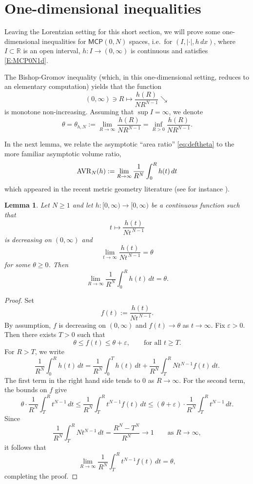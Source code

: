 \documentclass[a4paper,10pt]{article}
\newcommand{\R}{\mathbb{R}}
\newcommand{\MCP}{\mathsf{MCP}}
\theoremstyle{plain}
\newtheorem{lemma}{Lemma}[section]
\theoremstyle{definition}
\numberwithin{equation}{section}
\begin{document}
\section{One-dimensional inequalities}


Leaving the Lorentzian setting for this short section, we will prove some one-dimensional inequalities for $\MCP(0,N)$ spaces, i.e.\ for   $(I,|\cdot|, h \,dx)$, where $I\subset \R$ is an open interval,  $h:I\to (0,\infty)$ is continuous and satisfies \eqref{E:MCP0N1d}.

The Bishop-Gromov inequality (which, in this one-dimensional setting, reduces to an elementary computation) yields that the function $$(0,\infty) \ni R\mapsto  \frac{h(R)}{NR^{N-1}}\searrow$$ is monotone non-increasing. Assuming that $\sup I=\infty$,  we denote 
 \begin{equation}\label{eq:deftheta}
 \theta=\theta_{h,N}:=\lim_{R\to \infty} \frac{h(R)}{NR^{N-1}}=\inf_{R>0} \frac{h(R)}{NR^{N-1}}.
 \end{equation}

 In the next lemma, we relate the asymptotic ``area ratio'' \eqref{eq:deftheta} to the more familiar asymptotic volume ratio,
 $$
 {\rm{AVR}}_N(h):=\lim_{R\to\infty}\frac{1}{R^N}\int_0^R h(t)\,dt
 $$
 which appeared in the recent metric geometry literature (see for instance \cite{BK-MathAnn, CaMa-JEMS}). 

 \begin{lemma}
Let $N\ge 1$ and let $h:[0,\infty)\to[0,\infty)$ be a continuous function such that
\[
t\mapsto \frac{h(t)}{Nt^{\,N-1}}
\]
is decreasing on $(0,\infty)$ and
\[
\lim_{t\to\infty}\frac{h(t)}{Nt^{\,N-1}}=\theta
\]
for some $\theta\ge 0$. Then
\[
\lim_{R\to\infty}\frac{1}{R^N}\int_0^R h(t)\,dt=\theta.
\]
\end{lemma}

\begin{proof}
Set
\[
f(t):=\frac{h(t)}{Nt^{\,N-1}}.
\]
By assumption, $f$ is decreasing on $(0,\infty)$ and $f(t)\to \theta$ as $t\to\infty$.
Fix $\varepsilon>0$. Then there exists $T>0$ such that
\[
\theta \le f(t)\le \theta +\varepsilon, \qquad \text{for all } t\ge T.
\]
For $R>T$, we write
\[
\frac{1}{R^N}\int_0^R h(t)\,dt
=
\frac{1}{R^N}\int_0^T h(t)\,dt
+
\frac{1}{R^N}\int_T^R Nt^{N-1}f(t)\,dt.
\]
The first term in the right hand side tends to $0$ as $R\to\infty$. For the second term, the bounds on $f$ give
\[
\theta \cdot \frac{1}{R^N}\int_T^R t^{N-1}\,dt
\le
\frac{1}{R^N}\int_T^R t^{N-1}f(t)\,dt
\le
(\theta +\varepsilon)\cdot \frac{1}{R^N}\int_T^R t^{N-1}\,dt.
\]
Since
\[
\frac{1}{R^N}\int_T^R Nt^{N-1}\,dt
=
\frac{R^N-T^N}{R^N}\longrightarrow 1
\qquad\text{as }R\to\infty,
\]
it follows that
\[
\lim_{R\to\infty}\frac{1}{R^N}\int_T^R t^{N-1}f(t)\,dt=\theta,
\]
completing the proof.
\end{proof}
\end{document}
